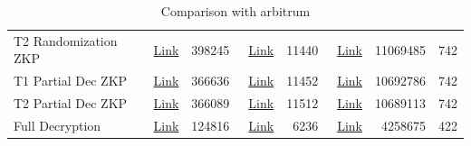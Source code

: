 \begin{table}[!h]
\begin{tabular}{|l|r|r|r|r|r|r|r|}
		T2 Randomization ZKP & ~\href{https://kovan.etherscan.io/tx/0x6dd05a76c771089144583a685c2fb9a6b566a626aa86b568230faf83268fdd92}{Link}& 398245 & ~\href{https://kovan.etherscan.io/tx/0xd790b2edd8800a183068b3253d7e5b00e57d850bce8d9b8572494539b58c7e3c}{Link} &11440& ~\href{https://explorer.offchainlabs.com/#/tx/0x71535a6b6d0124cbd61a4993e5e831cc4ba151eec60b1c368a79686f3f5bc1f4}{Link} & 11069485 & 742 \\  \cline{1-8}
		
		T1 Partial Dec ZKP &~\href{https://kovan.etherscan.io/tx/0x477b3e6b645cc672bbbe99ea3e7fa227962a3e1222071c266442a5ab8366e1bb}{Link} &366636 & ~\href{https://kovan.etherscan.io/tx/0xdd0ffc715dc5733bee36fd99d51898cf978de27ece76777099c4570929039a25}{Link} & 11452& ~\href{https://explorer.offchainlabs.com/#/tx/0x9f7fba14177790f6dad6ad9bb0ec3017803b466a27182768b11163162a3961c3}{Link} & 10692786& 742\\  \cline{1-8}
		
		T2 Partial Dec ZKP &~\href{https://kovan.etherscan.io/tx/0x59a6282197cbd71b2c25cd5f3547b41ca7baf33322088f35273c97fce5cf8b56}{Link} &366089 & ~\href{https://kovan.etherscan.io/tx/0xb2a71505f192dd2119634ddd69070c52eb3a3d993aeb632ea8f823eb62f26e84}{Link} & 11512&  ~\href{https://explorer.offchainlabs.com/#/tx/0x724578f12940ebd653613c5037576540ce129ef277e4db67aff135711327e8f8}{Link} & 10689113& 742\\  \cline{1-8}
		
		Full Decryption & ~\href{https://kovan.etherscan.io/tx/0x172804db2abcef274dedfad8f31f84a0bb26c87826842589537f1d511402b282}{Link} & 124816 &  ~\href{https://kovan.etherscan.io/tx/0x10788165eacbbe25066c163fa0cf7a5af07da32c05af001d0f05ad8946974c6e}{Link}& 6236& ~\href{https://explorer.offchainlabs.com/#/tx/0x3515cc045805f2f9af9f378f4725ab4845679ca15ecd2e86758f8d53eb9a7353}{Link} & 4258675 & 422\\  \hline
	\end{tabular}
	\caption{Comparison with arbitrum} 
	\label{tab:arbitrum}
\end{table}


%
%	



